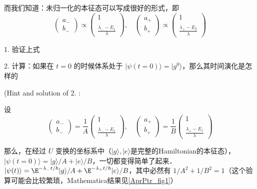\begin{exer}{}
而我们知道：未归一化的本征态可以写成很好的形式，即
\begin{equation}
\left(\begin{matrix}a_-\\b_-\end{matrix}\right) \propto \left(\begin{matrix}1 \\ \ \\ \displaystyle\frac{\lambda_- - E_1}{\lambda}\end{matrix}\right),\quad \left(\begin{matrix}a_+\\b_+\end{matrix}\right) \propto \left(\begin{matrix}1 \\ \ \\ \displaystyle\frac{\lambda_+ - E_2}{\lambda}\end{matrix}\right)
\end{equation}

1. 验证上式

2. 计算：如果在 $t=0$ 的时候体系处于 $|\psi(t=0)\rangle = |g^0\rangle$，那么其时间演化是怎样的

(Hint and solution of 2. :

设
\begin{equation}
\left(\begin{matrix}a_-\\b_-\end{matrix}\right) =\frac{1}{A} \left(\begin{matrix}1 \\ \ \\ \displaystyle\frac{\lambda_- - E_1}{\lambda}\end{matrix}\right),\quad \left(\begin{matrix}a_+\\b_+\end{matrix}\right) =\frac{1}{B} \left(\begin{matrix}1 \\ \ \\ \displaystyle\frac{\lambda_+ - E_1}{\lambda}\end{matrix}\right) 
\end{equation}

那么，在经过 $U$ 变换的坐标系中（$|g\rangle,|e\rangle$是完整的Hamiltonian的本征态），$|\psi(t=0)\rangle = |g\rangle/A + |e\rangle/B$，一切都变得简单了起来． $|\psi(t)\rangle = \E^{-\lambda_-t/\hbar}|g\rangle/A + \E^{-\lambda_+t/\hbar}|e\rangle/B$，其中必然有 $1/A^2 + 1/B^2 = 1$（这个验算可能会比较繁琐，Mathematica结果见\autoref{AprPtr_fig1}）


\end{exer}

